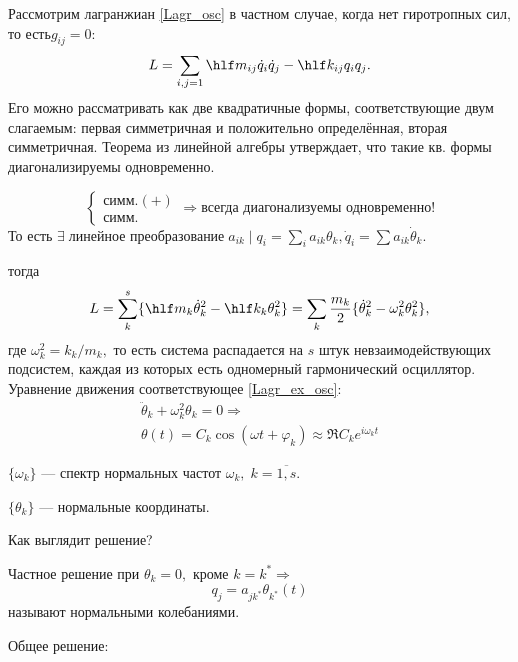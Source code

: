 \begin{ex}[$g_{ij} = 0$]
Рассмотрим лагранжиан \eqref{Lagr_osc} в частном случае, когда нет гиротропных сил, то есть$g_{ij} = 0$:
\begin{equation}
L = \sum_{i, j = 1} \hlf m_{ij} \dot{q}_i \dot{q}_j  - \hlf k_{ij} q_i q_j.
\end{equation}
Его можно рассматривать как две квадратичные формы, соответствующие двум слагаемым: первая симметричная и положительно определённая, вторая симметричная. Теорема из линейной алгебры утверждает, что такие кв. формы диагонализируемы одновременно.
\begin{thm}
$$
\left\{
\begin{array}{rcl}
\text{симм.$(+)$}\\
\text{симм.}
\end{array}
\right.
\Rightarrow \text{всегда диагонализуемы одновременно!}
$$
То есть $\exists\; \text{линейное преобразование}\; a_{ik}\; |\; q_i = \sum_i a_{ik} \theta_k, \dot{q}_i = \sum a_{ik} \dot{\theta}_k.$
\end{thm}
 тогда
\begin{equation}
L = \sum^s_k \lbrace \hlf m_k \dot{\theta}_k^2 - \hlf k_k \theta_k^2 \rbrace = \sum_k \frac{m_k}{2} \lbrace \dot{\theta}_k^2 - \omega^2_k \theta_k^2 \rbrace, \label{Lagr_ex_osc}
\end{equation}
где $\omega_k^2 = k_k / m_k,$ то есть система распадается на $s$ штук невзаимодействующих подсистем, каждая из которых есть  одномерный гармонический осциллятор.
Уравнение движения соответствующее \eqref{Lagr_ex_osc}:
\begin{gather}
\ddot{\theta}_k + \omega^2_k \theta_k = 0 \Rightarrow\\
\theta(t) = C_k \cos (\omega t + \varphi_k)  \approx \Re C_k e^{i \omega_ kt}
\end{gather}
\begin{dfn}
$\{\omega_k\}$ --- спектр нормальных частот $\omega_k,\; k = \overline{1, s}.$
\end{dfn}
\begin{dfn}
$\{\theta_k\}$ --- нормальные координаты.
\end{dfn}
Как выглядит решение? 
\begin{dfn}
Частное решение при $\theta_k = 0,$ кроме $k = k^* \Rightarrow$
\begin{equation}
q_j = a_{jk^*} \theta_{k^*}(t) 
\end{equation}
называют нормальными колебаниями.
\end{dfn}
Общее решение:

\end{ex}
